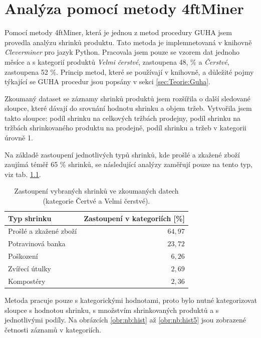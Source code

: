 \chapter{Analýza pomocí metody 4ftMiner}
\label{ch:cleverminer}

Pomocí metody 4ftMiner, která je jednou z metod procedury GUHA jsem provedla analýzu shrinků produktu. Tato metoda je implemnetovaná v  knihovně \emph{Cleverminer} pro jazyk Python. Pracovala jsem pouze se vzorem dat jednoho měsíce a s kategorií produktů \emph{Velmi čerstvé}, zastoupena 48, \% a \emph{Čerstvé}, zastoupena 52 \%. Princip metod, které se používají v knihovně, a důležité pojmy týkající se GUHA procedur jsou popsány v sekci \ref*{sec:Teorie:Guha}. 

Zkoumaný dataset se záznamy shrinků produktů jsem rozšířila o další sledované sloupce, které dávají do srovnání hodnotu shrinku a objem tržeb. Vytvořila jsem takto sloupce: podíl shrinku na celkových tržbách prodejny, podíl shrinku na tržbách shrinkovaného produktu na prodejně, podíl shrinku a tržeb v kategorii úrovně 1.

Na základě zastoupení jednotlivých typů shrinků, kde prošlé a zkažené zboží zaujímá téměř 65 \% shrinků, se následující analýzy zaměřují pouze na tento typ, viz tab. \ref*{tab:shrinkyZastoupeni}.

\begin{table}[hbtp!]
    \begin{center}
            \captionsetup{justification=centering}
    \caption{Zastoupení vybraných shrinků ve zkoumaných datech \\(kategorie Čertvé a Velmi čerstvé).}
    \begin{tabular}{l r}
        Typ shrinku & Zastoupení v kategoriích [\%]\\
        \midrule
        Prošlé a zkažené zboží & $64{,}97$ \\
        Potravinová banka & $23{,}72$ \\
         Poškození & $6{,}26$ \\
        Zvířecí útulky & $2{,}69$ \\
        Kompostéry &  $2{,}36$ \\
        \end{tabular}
    \label{tab:shrinkyZastoupeni}
\end{center}
\end{table}

Metoda pracuje pouze s kategorickými hodnotami, proto bylo nutné kategorizovat sloupce s hodnotou shrinku, s množstvím shrinkovaných produktů a s jednotlivými podíly. Na obrázcích \ref*{obr:nb:hist} až \ref{obr:nb:hist5} jsou zobrazené četnosti záznamů v kategoriích.

